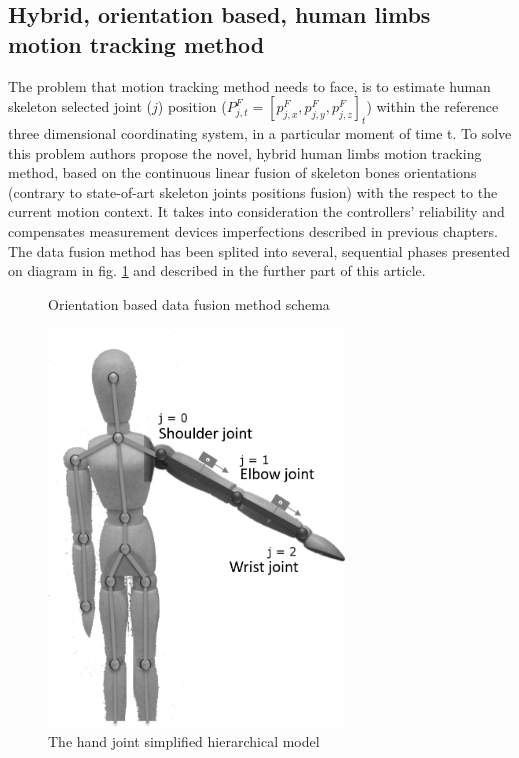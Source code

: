 \documentclass[sensors,article,submit,moreauthors,pdftex,10pt,a4paper]{mdpi}
\begin{document}
	\subsection{Hybrid, orientation based, human limbs motion tracking method}
	The problem that motion tracking method needs to face, is to estimate human skeleton selected joint ($j$) position ($P^F_{j,t} = [p^F_{j,x}, p^F_{j,y}, p^F_{j,z}]_t$) within the reference three dimensional coordinating system, in a particular moment of time t. To solve this problem authors propose the novel, hybrid human limbs motion tracking method, based on the continuous linear fusion of skeleton bones orientations (contrary to state-of-art skeleton joints positions fusion) with the respect to the current motion context. It takes into consideration the controllers’ reliability and compensates measurement devices imperfections described in previous chapters. The data fusion method has been splited into several, sequential phases presented on diagram in fig. \ref{fig:methodPhases} and described in the further part of this article. 
		
	\begin{minipage}{\linewidth}
		\centering
		\begin{minipage}[b]{0.45\linewidth}
			\begin{figure}[H]
				\scalebox{0.5}{
					
				}
				\caption{Orientation based data fusion method schema}
				\label{fig:methodPhases}
			\end{figure}
		\end{minipage}
		\hfill
		\begin{minipage}[b]{0.45\linewidth}
			\begin{figure}[H]
				\includegraphics[width=0.7\textwidth]{Figure11.png}
				\caption{The hand joint simplified hierarchical model}		
				\label{fig:hybrid:jointsHierarchy}	
			\end{figure}
		\end{minipage}
	\end{minipage}
		
\end{document}
